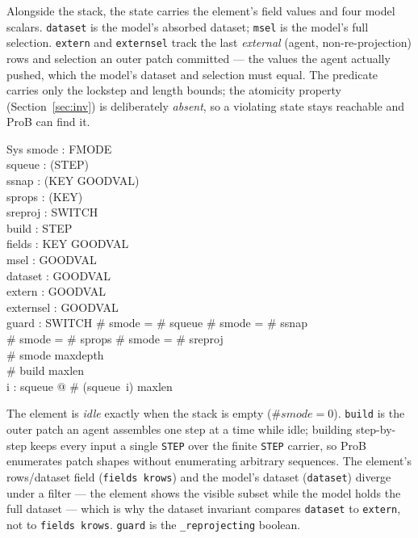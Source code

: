 \documentclass[a4paper,10pt,fleqn]{article}
\begin{document}
Alongside the stack, the state carries the element's field values and four model
scalars.  \texttt{dataset} is the model's absorbed dataset; \texttt{msel} is the
model's full selection.  \texttt{extern} and \texttt{externsel} track the last
\emph{external} (agent, non-re-projection) rows and selection an outer patch
committed --- the values the agent actually pushed, which the model's dataset and
selection must equal.  The predicate carries only the lockstep and length bounds;
the atomicity property (Section~\ref{sec:inv}) is deliberately \emph{absent}, so
a violating state stays reachable and ProB can find it.

\begin{schema}{Sys}
  smode : \seq FMODE \\
  squeue : \seq (\seq STEP) \\
  ssnap : \seq (KEY \fun GOODVAL) \\
  sprops : \seq (\power KEY) \\
  sreproj : \seq SWITCH \\
  build : \seq STEP \\
  fields : KEY \fun GOODVAL \\
  msel : GOODVAL \\
  dataset : GOODVAL \\
  extern : GOODVAL \\
  externsel : GOODVAL \\
  guard : SWITCH
\where
  \# smode = \# squeue \land \# smode = \# ssnap \\
  \land \# smode = \# sprops \land \# smode = \# sreproj \\
  \# smode \leq maxdepth \\
  \# build \leq maxlen \\
  \forall i : \dom squeue @ \# (squeue~i) \leq maxlen
\end{schema}

The element is \emph{idle} exactly when the stack is empty ($\# smode = 0$).
\texttt{build} is the outer patch an agent assembles one step at a time while
idle; building step-by-step keeps every input a single \texttt{STEP} over the
finite \texttt{STEP} carrier, so ProB enumerates patch shapes without enumerating
arbitrary sequences.  The element's rows/dataset field (\texttt{fields~krows})
and the model's dataset (\texttt{dataset}) diverge under a filter --- the element
shows the visible subset while the model holds the full dataset --- which is why
the dataset invariant compares \texttt{dataset} to \texttt{extern}, not to
\texttt{fields~krows}.  \texttt{guard} is the \texttt{\_reprojecting} boolean.
\end{document}
